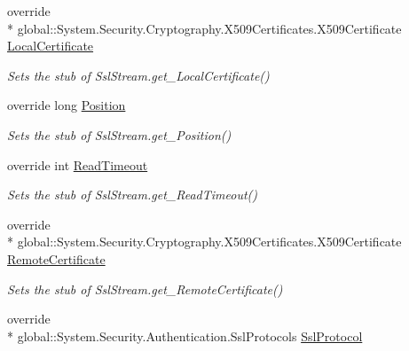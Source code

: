 \begin{DoxyCompactItemize}
override \\*
global\-::\-System.\-Security.\-Cryptography.\-X509\-Certificates.\-X509\-Certificate \hyperlink{class_system_1_1_net_1_1_security_1_1_fakes_1_1_stub_ssl_stream_a64a1c19b60beea3650418aec75c9244c}{Local\-Certificate}
\begin{DoxyCompactList}\small\item\em Sets the stub of Ssl\-Stream.\-get\-\_\-\-Local\-Certificate()\end{DoxyCompactList}\item 
override long \hyperlink{class_system_1_1_net_1_1_security_1_1_fakes_1_1_stub_ssl_stream_a548f8461c2e82d12da560e90ac42f7d2}{Position}
\begin{DoxyCompactList}\small\item\em Sets the stub of Ssl\-Stream.\-get\-\_\-\-Position()\end{DoxyCompactList}\item 
override int \hyperlink{class_system_1_1_net_1_1_security_1_1_fakes_1_1_stub_ssl_stream_a74ed283ded0e55635c990554d0c6d9f4}{Read\-Timeout}
\begin{DoxyCompactList}\small\item\em Sets the stub of Ssl\-Stream.\-get\-\_\-\-Read\-Timeout()\end{DoxyCompactList}\item 
override \\*
global\-::\-System.\-Security.\-Cryptography.\-X509\-Certificates.\-X509\-Certificate \hyperlink{class_system_1_1_net_1_1_security_1_1_fakes_1_1_stub_ssl_stream_a55db21f115ebb317f7221da7a766b664}{Remote\-Certificate}
\begin{DoxyCompactList}\small\item\em Sets the stub of Ssl\-Stream.\-get\-\_\-\-Remote\-Certificate()\end{DoxyCompactList}\item 
override \\*
global\-::\-System.\-Security.\-Authentication.\-Ssl\-Protocols \hyperlink{class_system_1_1_net_1_1_security_1_1_fakes_1_1_stub_ssl_stream_a22e61f7a1c710097884036ba8641bb45}{Ssl\-Protocol}

\end{DoxyCompactItemize}
